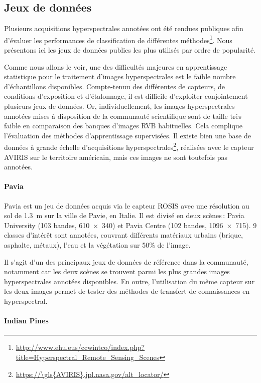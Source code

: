 \subsection{Jeux de données}
\label{sec:hyperspectral_datasets}

Plusieurs acquisitions hyperspectrales annotées ont été rendues publiques afin d'évaluer les performances de classification de différentes méthodes\footnote{\url{http://www.ehu.eus/ccwintco/index.php?title=Hyperspectral_Remote_Sensing_Scenes}}. Nous présentons ici les jeux de données publics les plus utilisés par ordre de popularité.

Comme nous allons le voir, une des difficultés majeures en apprentissage statistique pour le traitement d'images hyperspectrales est le faible nombre d'échantillons disponibles. Compte-tenuu des différentes de capteurs, de conditions d'exposition et d'étalonnage, il est difficile d'exploiter conjointement plusieurs jeux de données. Or, individuellement, les images hyperspectrales annotées mises à disposition de la communauté scientifique sont de taille très faible en comparaison des banques d'images \gls{RVB} habituelles. Cela complique l'évaluation des méthodes d'apprentissage supervisées. Il existe bien une base de données à grande échelle d'acquisitions hyperspectrales\footnote{\url{https://\gls{AVIRIS}.jpl.nasa.gov/alt_locator/}}, réalisées avec le capteur \gls{AVIRIS} sur le territoire américain, mais ces images ne sont toutefois pas annotées.

\paragraph{Pavia}

Pavia est un jeu de données acquis via le capteur ROSIS avec une résolution au sol de \SI{1,3}{\meter} sur la ville de Pavie, en Italie. Il est divisé en deux scènes\,: Pavia University (103 bandes, \SI{610x340}{\px}) et Pavia Centre (102 bandes, \SI{1096x715}{\px}). 9 classes d'intérêt sont annotées, couvrant différents matériaux urbains (brique, asphalte, métaux), l'eau et la végétation sur 50\% de l'image.

Il s'agit d'un des principaux jeux de données de référence dans la communauté, notamment car les deux scènes se trouvent parmi les plus grandes images hyperspectrales annotées disponibles. En outre, l'utilisation du même capteur sur les deux images permet de tester des méthodes de transfert de connaissances en hyperspectral.

\paragraph{Indian Pines}

